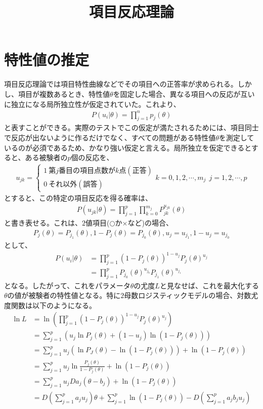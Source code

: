 \documentclass[12pt]{jarticle}
\title{項目反応理論}
\begin{document}
\maketitle
\section{特性値の推定}
項目反応理論では項目特性曲線などでその項目への正答率が求められる。しかし、項目が複数あるとき、特性値$\theta$を固定した場合、異なる項目への反応が互いに独立になる局所独立性が仮定されていた。これより、
\begin{eqnarray}
  \label{00}
  \displaystyle P(u_{i}|\theta) =\prod_{j = 1}^{n} p_{j}(\theta)
\end{eqnarray}
と表すことができる。実際のテストでこの仮定が満たされるためには、項目同士で反応が出ないように作るだけでなく、すべての問題がある特性値$\theta$を測定しているのが必須であるため、かなり強い仮定と言える。局所独立を仮定できるとすると、ある被験者の$p$個の反応を、
\begin{eqnarray}
  \label{01}
  \displaystyle u_{jk} =\left\{\begin{array}{l}1 \ 第j番目の項目点数がk点(正答)\\ 0 \ それ以外(誤答)\end{array}\right. k = 0,1,2,\cdots,m_{j} \ \ j = 1,2,\cdots,p
\end{eqnarray}
とすると、この特定の項目反応を得る確率は、
\begin{eqnarray}
  \label{02}
  \displaystyle P(u_{jk}|\theta) = \prod_{j = 1}^{p} \prod_{k = 0}^{m_j} P^{u_{jk}}_{jk}(\theta)
\end{eqnarray}
と書き表せる。これは、$2$値項目($\bigcirc$か$\times$など)の場合、
\begin{eqnarray}
  \label{03}
  \displaystyle P_{j}(\theta) = P_{j_1}(\theta),1 - P_j(\theta) = P_{j_0}(\theta),u_j = u_{j_1},1 - u_j = u_{j_0}
\end{eqnarray}
として、
\begin{align}
  \label{04}
  \displaystyle P(u_{i}|\theta) &= \prod_{j = 1}^{p} (1 - P_j(\theta))^{1 - u_j}P_j(\theta)^{u_j}\\
  &=\prod_{j = 1}^{p} P_{j_0}(\theta)^{u_{j_0}}P_{j_1}(\theta)^{u_{j_1}}
\end{align}
となる。したがって、これをパラメータ$\theta$の尤度$L$と見なせば、これを最大化する$\theta$の値が被験者の特性値となる。特に$2$母数ロジスティックモデルの場合、対数尤度関数は以下のようになる。
\begin{align*}
  \label{05}
  \displaystyle \ln L &= \ln \left(\prod_{j = 1}^{p} (1 - P_j(\theta))^{1 - u_j}P_j(\theta)^{u_j}\right)\\
  &= \sum_{j = 1}^{p} \left(u_j\ln P_j(\theta) + (1 - u_j)\ln(1 - P_j(\theta)) \right) \\
  &= \sum_{j = 1}^{p}  u_j(\ln P_J(\theta)- \ln (1 - P_j(\theta))) + \ln (1 - P_j(\theta)) \\
  &= \sum_{j = 1}^{p} u_j \ln \frac{P_j(\theta)}{1 - P_j(\theta)} + \ln(1-P_j(\theta)) \\
  &= \sum_{j = 1}^{p} u_j  Da_j(\theta - b_j) + \ln(1-P_j(\theta)) \\
  &= D(\sum_{j = 1}^{p}a_ju_j)\theta  + \sum_{j = 1}^{p} \ln (1 - P_j(\theta)) - D(\sum_{j = 1}^{p} a_jb_ju_j) \tag{7}
\end{align*}
\end{document}

